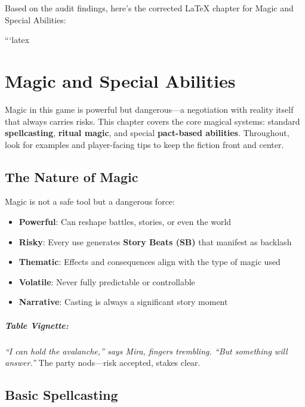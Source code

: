 Based on the audit findings, here's the corrected LaTeX chapter for Magic and Special Abilities:

```latex
\chapter{Magic and Special Abilities} \label{ch:magic}

Magic in this game is powerful but dangerous—a negotiation with reality itself that always carries risks. This chapter covers the core magical systems: standard \textbf{spellcasting}, \textbf{ritual magic}, and special \textbf{pact-based abilities}. Throughout, look for examples and player-facing tips to keep the fiction front and center.

\section{The Nature of Magic} 

Magic is not a safe tool but a dangerous force:
\begin{itemize}
\item \textbf{Powerful}: Can reshape battles, stories, or even the world
\item \textbf{Risky}: Every use generates \textbf{Story Beats (SB)} that manifest as backlash
\item \textbf{Thematic}: Effects and consequences align with the type of magic used
\item \textbf{Volatile}: Never fully predictable or controllable
\item \textbf{Narrative}: Casting is always a significant story moment
\end{itemize}

\paragraph{Table Vignette:}
\emph{``I can hold the avalanche,'' says Mira, fingers trembling. ``But something will answer.''} The party nods—risk accepted, stakes clear.

\section{Basic Spellcasting} 

